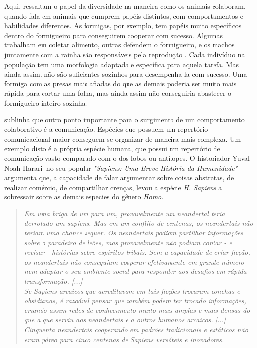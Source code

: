 Aqui,  ressaltam o papel da diversidade na maneira como os animais colaboram, quando fala em animais que cumprem papéis distintos, com comportamentos e habilidades diferentes. As formigas, por exemplo, tem papéis muito específicos dentro do formigueiro para conseguirem cooperar com sucesso. Algumas trabalham em coletar alimento, outras defendem o formigueiro, e os machos juntamente com a rainha são responsáveis pela reprodução \cite{maturana2001}. Cada indivíduo na população tem uma morfologia adaptada e específica para aquela tarefa. Mas ainda assim, não são suficientes sozinhos para desempenha-la com sucesso. Uma formiga com as presas mais afiadas do que as demais poderia ser muito mais rápida para cortar uma folha, mas ainda assim não conseguiria abastecer o formigueiro inteiro sozinha. 

 sublinha que outro ponto importante para o surgimento de um comportamento colaborativo é a comunicação. Espécies que possuem um repertório comunicacional maior conseguem se organizar de maneira mais complexa. Um exemplo disto é a própria espécie humana, que possui um repertório de comunicação vasto comparado com o dos lobos ou antílopes. O historiador Yuval Noah Harari, no seu popular \textit{"Sapiens: Uma Breve História da Humanidade"} argumenta que, a capacidade de falar argumentar sobre coisas abstratas, de realizar comércio, de compartilhar crenças, levou a espécie \textit{H. Sapiens} a sobressair sobre as demais especies do gênero \textit{Homo}.

\begin{quote}
\textit{Em uma briga de um para um, provavelmente um neandertal teria derrotado um sapiens. Mas em um conflito de centenas, os neandertais não teriam uma chance sequer. Os neandertais podiam partilhar informações sobre o paradeiro de leões, mas provavelmente não podiam contar - e revisar - histórias sobre espíritos tribais. Sem a capacidade de criar ficção, os neandertais não conseguiam cooperar efetivamente em grande número nem adaptar o seu ambiente social para responder aos desafios em rápida transformação. [...] \\ Se Sapiens arcaicos que acreditavam em tais ficções trocaram conchas e obsidianas, é razoável pensar que também podem ter trocado informações, criando assim redes de conhecimento muito mais amplas e mais densas do que a que serviu aos neandertais e a outros humanos arcaicos. [...] \\
Cinquenta neandertais cooperando em padrões tradicionais e estáticos não eram páreo para cinco centenas de Sapiens versáteis e inovadores.} \cite{harari2014}
\end{quote}

